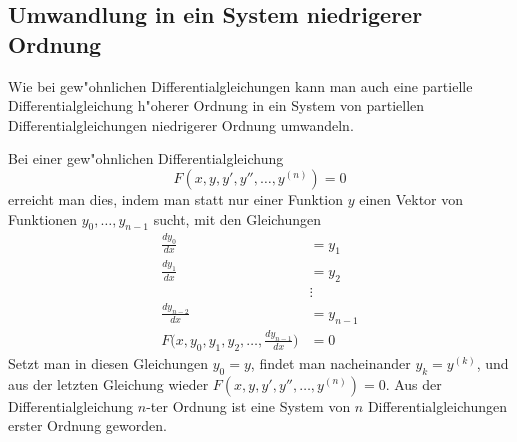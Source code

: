 \subsection{Umwandlung in ein System niedrigerer Ordnung\label{klassifikation:umwandlung}}
Wie bei gew"ohnlichen Differentialgleichungen kann man auch eine
partielle Differentialgleichung h"oherer Ordnung in ein System
von partiellen Differentialgleichungen niedrigerer Ordnung
umwandeln.

Bei einer gew"ohnlichen Differentialgleichung 
\[
F(x,y,y',y'',\dots,y^{(n)})=0
\]
erreicht man dies, indem man statt nur einer Funktion $y$ einen
Vektor von Funktionen $y_0,\dots,y_{n-1}$ sucht, mit den Gleichungen
\begin{align*}
\frac{dy_0}{dx}&=y_1\\
\frac{dy_1}{dx}&=y_2\\
&\vdots\\
\frac{dy_{n-2}}{dx}&=y_{n-1}\\
F\biggl(x,y_0,y_1,y_2,\dots,\frac{dy_{n-1}}{dx}\biggr)&=0
\end{align*}
Setzt man in diesen Gleichungen $y_0=y$, findet man nacheinander
$y_k=y^{(k)}$, und aus der letzten Gleichung wieder
$F(x,y,y',y'',\dots,y^{(n)})=0$. Aus der Differentialgleichung $n$-ter
Ordnung ist eine System von $n$ Differentialgleichungen erster Ordnung
geworden.

